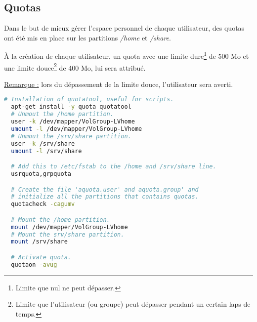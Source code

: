 \subsection{Quotas}
\label{subsec:quotas}

Dans le but de mieux gérer l'espace personnel de chaque utilisateur, des quotas
ont été mis en place sur les partitions \textit{/home} et \textit{/share}.

À la création de chaque utilisateur, un quota avec une limite
dure\footnote{Limite que nul ne peut dépasser.} de 500 Mo et une limite
douce\footnote{Limite que l'utilisateur (ou groupe) peut dépasser pendant un
certain laps de temps.} de 400 Mo, lui sera attribué.

\underline{Remarque :} lors du dépassement de la limite douce, l'utilisateur
sera averti.

\begin{lstlisting}[language=bash]
  # Installation of quotatool, useful for scripts.
  apt-get install -y quota quotatool
  # Unmout the /home partition.
  user -k /dev/mapper/VolGroup-LVhome
  umount -l /dev/mapper/VolGroup-LVhome
  # Unmout the /srv/share partition.
  user -k /srv/share
  umount -l /srv/share

  # Add this to /etc/fstab to the /home and /srv/share line.
  usrquota,grpquota

  # Create the file 'aquota.user' and aquota.group' and
  # initialize all the partitions that contains quotas.
  quotacheck -cagumv

  # Mount the /home partition.
  mount /dev/mapper/VolGroup-LVhome
  # Mount the srv/share partition.
  mount /srv/share

  # Activate quota.
  quotaon -avug
\end{lstlisting}

